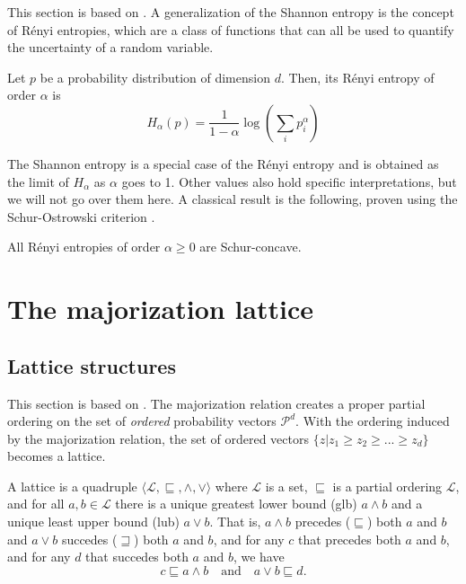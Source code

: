 This section is based on \cite{rényi_measures_1961}. A generalization of the Shannon entropy is the concept of R\'enyi entropies, which are a class of functions that can all be used to quantify the uncertainty of a random variable.

\begin{definition} \label{def:renyi_entropies}
    Let $p$ be a probability distribution of dimension $d$. Then, its R\'enyi entropy of order $\alpha$ is
    \begin{equation}
        H_\alpha(p) = \frac{1}{1 - \alpha} \log \left(\sum_i p_i^\alpha\right)
    \end{equation}
\end{definition}

The Shannon entropy is a special case of the R\'enyi entropy and is obtained as the limit of $H_\alpha$ as $\alpha$ goes to 1. Other values also hold specific interpretations, but we will not go over them here. A classical result is the following, proven using the Schur-Ostrowski criterion \cite[p. 84]{marshall_inequalities_2011}.

\begin{lemma}
    All R\'enyi entropies of order $\alpha \geq 0$ are Schur-concave.    
\end{lemma}



\section{The majorization lattice} \label{sec:majorization_lattice}

\subsection{Lattice structures} \label{sec:lattice_structures}

This section is based on \cite{cicalese_supermodularity_2002}. The majorization relation creates a proper partial ordering on the set of \textit{ordered} probability vectors $\mathcal{P}^d$. With the ordering induced by the majorization relation, the set of ordered vectors $\{z | z_1 \geq z_2 \geq ... \geq z_d\}$ becomes a lattice.

\begin{definition}[Lattice] \label{def:lattice} %
    A lattice is a quadruple $\langle \mathcal{L}, \sqsubseteq, \wedge, \vee \rangle$ where $\mathcal{L}$ is a set, $\sqsubseteq$ is a partial ordering $\mathcal{L}$, and for all $a, b \in \mathcal{L}$ there is a unique greatest lower bound (glb) $a \wedge b$ and a unique least upper bound (lub) $a \vee b$. That is, $a \wedge b$ precedes ($\sqsubseteq$) both $a$ and $b$ and $a \vee b$ succedes ($\sqsupseteq$) both $a$ and $b$, and for any $c$ that precedes both $a$ and $b$, and for any $d$ that succedes both $a$ and $b$, we have
    \begin{equation}
        c \sqsubseteq a \wedge b \quad \text{and} \quad a \vee b \sqsubseteq d.
    \end{equation}
\end{definition}

